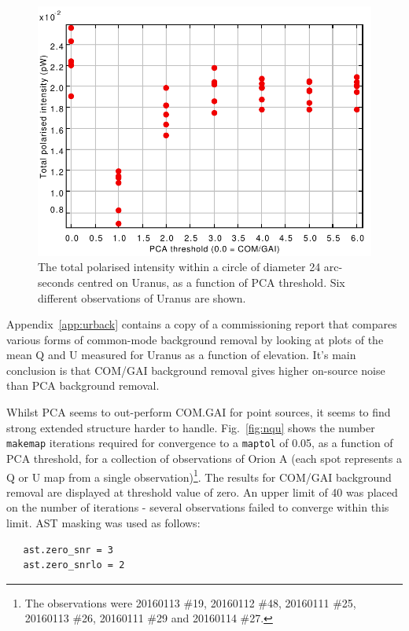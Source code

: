 \documentclass[twoside,11pt]{starlink}
\begin{document}
\begin{figure}
\includegraphics[width=\columnwidth]{pca4}
\caption{The total polarised intensity within a circle of diameter 24
arc-seconds centred on Uranus, as  a function of PCA threshold. Six
different observations of Uranus are shown.}
\label{fig:pca4}
\end{figure}

Appendix~\ref{app:urback} contains a copy of a commissioning report that
compares various forms of common-mode background removal by looking at
plots of the mean Q and U measured for Uranus as a function of elevation.
It's main conclusion is that COM/GAI background removal gives higher
on-source noise than PCA background removal.

Whilst PCA seems to out-perform COM.GAI for point sources, it seems to
find strong extended structure harder to handle. Fig.~\ref{fig:nqu} shows
the number \texttt{makemap} iterations required for convergence to a
\texttt{maptol} of 0.05, as a function of PCA threshold, for a collection
of observations of Orion A (each spot represents a Q or U map from a
single observation)\footnote{The observations were  20160113 \#19,
20160112 \#48, 20160111 \#25, 20160113 \#26, 20160111 \#29 and 20160114 \#27.}.
The results for COM/GAI background removal are displayed at threshold value
of zero. An upper limit of 40 was placed on the number of iterations -
several observations failed to converge within this limit. AST masking
was used as follows:

\begin{verbatim}
   ast.zero_snr = 3
   ast.zero_snrlo = 2
\end{verbatim}
\end{document}
